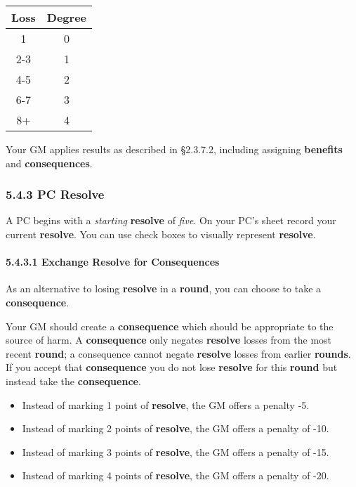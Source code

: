 \documentclass[
  11pt,
]{article}
\providecommand{\tightlist}{%
  \setlength{\itemsep}{0pt}\setlength{\parskip}{0pt}}
\begin{document}
\begin{longtable}[]{@{}cc@{}}
\toprule
Loss & Degree \\
\midrule
\endhead
1 & 0 \\
2-3 & 1 \\
4-5 & 2 \\
6-7 & 3 \\
8+ & 4 \\
\bottomrule
\end{longtable}

Your GM applies results as described in §2.3.7.2, including assigning
\textbf{benefits} and \textbf{consequences}.

\hypertarget{pc-resolve}{%
\subsubsection{5.4.3 PC Resolve}\label{pc-resolve}}

A PC begins with a \emph{starting} \textbf{resolve} of \emph{five}. On
your PC's sheet record your current \textbf{resolve}. You can use check
boxes to visually represent \textbf{resolve}.

\hypertarget{exchange-resolve-for-consequences}{%
\paragraph{5.4.3.1 Exchange Resolve for
Consequences}\label{exchange-resolve-for-consequences}}

As an alternative to losing \textbf{resolve} in a \textbf{round}, you
can choose to take a \textbf{consequence}.

Your GM should create a \textbf{consequence} which should be appropriate
to the source of harm. A \textbf{consequence} only negates
\textbf{resolve} losses from the most recent \textbf{round}; a
consequence cannot negate \textbf{resolve} losses from earlier
\textbf{rounds}. If you accept that \textbf{consequence} you do not lose
\textbf{resolve} for this \textbf{round} but instead take the
\textbf{consequence}.

\begin{itemize}
\tightlist
\item
  Instead of marking 1 point of \textbf{resolve}, the GM offers a
  penalty -5.
\item
  Instead of marking 2 points of \textbf{resolve}, the GM offers a
  penalty of -10.
\item
  Instead of marking 3 points of \textbf{resolve}, the GM offers a
  penalty of -15.
\item
  Instead of marking 4 points of \textbf{resolve}, the GM offers a
  penalty of -20.
\end{itemize}
\end{document}
